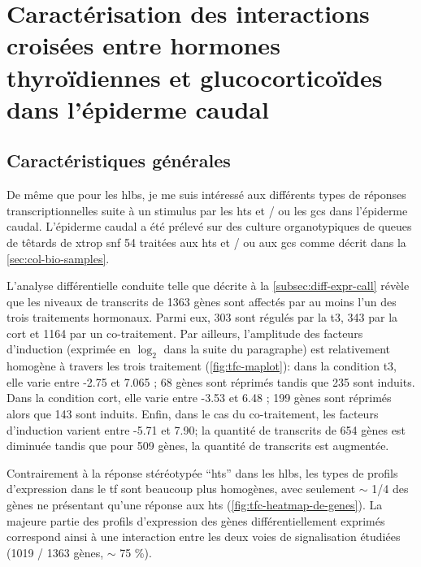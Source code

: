 \documentclass[../main.tex]{subfiles}
\begin{document}
\chapter{Caractérisation des interactions croisées entre hormones thyroïdiennes et glucocorticoïdes dans l'épiderme caudal}


\section{Caractéristiques générales}

	De même que pour les \glspl{hlb}, je me suis intéressé aux différents types de réponses transcriptionnelles suite à un stimulus par les \glspl{ht} et / ou les \glspl{gc} dans l'épiderme caudal.
	L'épiderme caudal a été prélevé sur des culture organotypiques de queues de têtards de \gls{xtrop} \gls{snf} 54 traitées aux \glspl{ht} et / ou aux \glspl{gc} comme décrit dans la \autoref{sec:col-bio-samples}.
	\par
	L'analyse différentielle conduite telle que décrite à la \autoref{subsec:diff-expr-call} révèle que les niveaux de transcrits de 1363 gènes sont affectés par au moins l'un des trois traitements hormonaux.
	Parmi eux, 303 sont régulés par la \gls{t3}, 343 par la \gls{cort} et 1164 par un co-traitement.
	Par ailleurs, l'amplitude des facteurs d'induction (exprimée en $\log_2$ dans la suite du paragraphe) est relativement homogène à travers les trois traitement (\autoref{fig:tfc-maplot}):
	dans la condition \gls{t3}, elle varie entre -2.75 et 7.065 ; 68 gènes sont réprimés tandis que 235 sont induits.
	Dans la condition \gls{cort}, elle varie entre -3.53 et 6.48 ; 199 gènes sont réprimés alors que 143 sont induits.
	Enfin, dans le cas du co-traitement, les facteurs d'induction varient entre -5.71 et 7.90; la quantité de transcrits de 654 gènes est diminuée tandis que pour 509 gènes, la quantité de transcrits est augmentée.

	

	Contrairement à la réponse stéréotypée ``\glspl{ht}'' dans les \glspl{hlb}, les types de profils d'expression dans le \gls{tf} sont beaucoup plus homogènes, avec seulement $\sim$ 1/4 des gènes ne présentant qu'une réponse aux \glspl{ht} (\autoref{fig:tfc-heatmap-de-genes}).
	La majeure partie des profils d'expression des gènes différentiellement exprimés correspond ainsi à une interaction entre les deux voies de signalisation étudiées (1019 / 1363 gènes, $\sim$ 75 \%).

	
\end{document}
